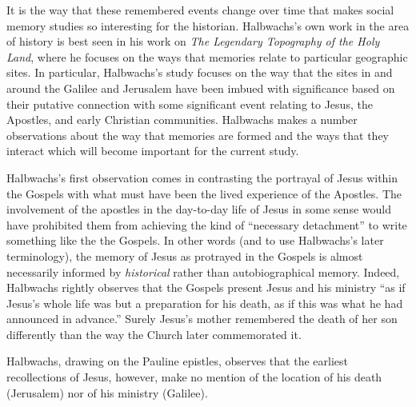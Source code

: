 It is the way that these remembered events change over time that makes
social memory studies so interesting for the historian. Halbwachs's own
work in the area of history is best seen in his work on \emph{The
Legendary Topography of the Holy Land}, where he focuses on the ways
that memories relate to particular geographic sites. In particular,
Halbwachs's study focuses on the way that the sites in and around the
Galilee and Jerusalem have been imbued with significance based on their
putative connection with some significant event relating to Jesus, the
Apostles, and early Christian communities. Halbwachs makes a number
observations about the way that memories are formed and the ways that
they interact which will become important for the current study.

Halbwachs's first observation comes in contrasting the portrayal of
Jesus within the Gospels with what must have been the lived experience
of the Apostles.\autocite[193--198]{halbwachs1992} The involvement of
the apostles in the day-to-day life of Jesus in some sense would have
prohibited them from achieving the kind of ``necessary detachment'' to
write something like the the Gospels. In other words (and to use
Halbwachs's later terminology), the memory of Jesus as protrayed in the
Gospels is almost necessarily informed by \emph{historical} rather than
autobiographical memory.\autocite[194]{halbwachs1992} Indeed, Halbwachs
rightly observes that the Gospels present Jesus and his ministry ``as if
Jesus's whole life was but a preparation for his death, as if this was
what he had announced in advance.''\autocite[198]{halbwachs1992} Surely
Jesus's mother remembered the death of her son differently than the way
the Church later commemorated it.\autocites[Regardless of whether
Halbwachs's conception of Early Christianity would be considered sound
today, the idea that the Gospels represent several collective
remembrances of Jesus's life, ministry and death each bearing marks from
their own \emph{Sitz im Leben} (to borrow from the form critics) seems
relatively uncontroversial. A number of studies on the Jesus and early
Christian memory have come about in the past several years.
See][]{ledonne2009}{rodriguez2010}[For an overview of the modern impact
of Halbwachs (and memory studies more generally) on the field of
Historical Jesus studies, see][]{keith_ec2015}[and][]{keith_ec2015b}

Halbwachs, drawing on the Pauline epistles, observes that the earliest
recollections of Jesus, however, make no mention of the location of his
death (Jerusalem) nor of his ministry (Galilee).


